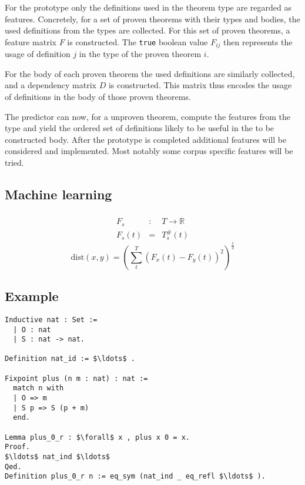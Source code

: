 For the prototype only the definitions used in the theorem type are regarded as features.
Concretely, for a set of proven theorems with their types and bodies, the used definitions from the types are collected.
For this set of proven theorems, a feature matrix $F$ is constructed.
The \texttt{true} boolean value $F_{ij}$ then represents the usage of definition $j$ in the type of the proven theorem $i$.

For the body of each proven theorem the used definitions are similarly collected, and a dependency matrix $D$ is constructed.
This matrix thus encodes the usage of definitions in the body of those proven theorems.

The predictor can now, for a unproven theorem, compute the features from the type and yield the ordered set of definitions likely to be useful in the to be constructed body.
After the prototype is completed additional features will be considered and implemented.
Most notably some corpus specific features will be tried.

\subsection{Machine learning}

\subsubsection{\knn}
$$
\begin{array}{lcl}
	F_s & : & T \rightarrow \mathbb{R} \\
	F_s(t) & = & T_s^\#(t)
\end{array}
$$
$$ \text{dist}(x, y) = \left( \sum_t^T \left( F_x(t) - F_y(t) \right)^2 \right)^{\frac{1}{2}} $$

\subsubsection{\nb}

\subsection{Example}
\begin{lstlisting}[language=Coq, mathescape]
Inductive nat : Set :=
  | O : nat
  | S : nat -> nat.

Definition nat_id := $\ldots$ .

Fixpoint plus (n m : nat) : nat :=
  match n with
  | O => m
  | S p => S (p + m)
  end.

Lemma plus_0_r : $\forall$ x , plus x 0 = x.
Proof.
$\ldots$ nat_ind $\ldots$
Qed.
Definition plus_0_r n := eq_sym (nat_ind _ eq_refl $\ldots$ ).
\end{lstlisting}

